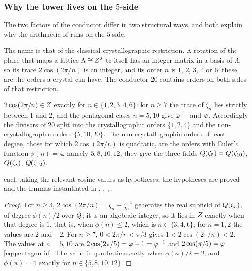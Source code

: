 \subsubsection{Why the tower lives on the $5$-side}\label{ssec:crystallographic}

The two factors of the conductor differ in two structural ways, and both explain
why the arithmetic of  runs on the $5$-side.

The name is that of the classical crystallographic restriction.  A rotation of the plane that maps a
lattice $\Lambda\cong Z^2$ to itself has an integer matrix in a basis of $\Lambda$, so its trace
$2\cos(2\pi/n)$ is an integer, and its order $n$ is $1$, $2$, $3$, $4$ or $6$: these are the orders a
crystal can have.  The conductor $20$ contains orders on both sides of that restriction.

\begin{proposition}\label{prop:crystallographic}
$2\cos(2\pi/n)\in Z$ exactly for $n\in\{1,2,3,4,6\}$: for $n\ge7$ the trace of
$\zeta_n$ lies strictly between $1$ and $2$, and the
pentagonal cases $n=5,10$ give $\varphi^{-1}$ and $\varphi$.  Accordingly the divisors of
$20$ split into the crystallographic orders $\{1,2,4\}$ and the non-crystallographic
orders $\{5,10,20\}$.  The non-crystallographic orders of least degree, those for which
$2\cos(2\pi/n)$ is quadratic, are the orders with Euler's function $\phi(n)=4$, namely
$5,8,10,12$; they give the three fields $Q(\zeta_5)=Q(\zeta_{10})$, $Q(\zeta_8)$,
$Q(\zeta_{12})$.
\end{proposition}
each taking the
relevant cosine values as hypotheses; the hypotheses are proved and the lemmas
instantiated in ,
,
,
.
\begin{proof}
For $n\ge3$, $2\cos(2\pi/n)=\zeta_n+\zeta_n^{-1}$ generates the real subfield of $Q(\zeta_n)$, of degree
$\phi(n)/2$ over $Q$; it is an algebraic integer, so it lies in $Z$ exactly when that degree is $1$,
that is, when $\phi(n)\le2$, which is $n\in\{3,4,6\}$; for $n=1,2$ the values are $2$ and $-2$.  For
$n\ge7$, $0<2\pi/n<\pi/3$ gives $1<2\cos(2\pi/n)<2$.  The values at $n=5,10$ are
$2\cos(2\pi/5)=\varphi-1=\varphi^{-1}$ and $2\cos(\pi/5)=\varphi$  \eqref{eq:pentagon-id}.  The value is
quadratic exactly when $\phi(n)/2=2$, and $\phi(n)=4$ exactly for $n\in\{5,8,10,12\}$.
\end{proof}

